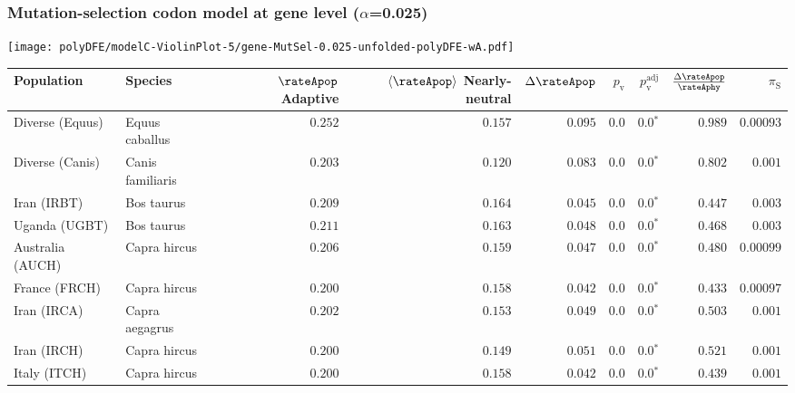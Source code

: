 \subsubsection*{Mutation-selection codon model at gene level ($\alpha$=0.025)}
\begin{center}
    \texttt{[image: polyDFE/modelC-ViolinPlot-5/gene-MutSel-0.025-unfolded-polyDFE-wA.pdf]}
    \begin{adjustbox}{width = 1\textwidth}
        \begin{tabular}{|l|l|r|r|r|r|r|r|r|}
            \toprule
            Population & Species & \specialcell{$\rateApop$ \\ Adaptive}                & \specialcell{$\left< \rateApop \right>$ \\ Nearly-neutral}                & $\Delta \rateApop $    & $p_{\mathrm{v}}$ & $p_{\mathrm{v}}^{\mathrm{adj}}$ & $\frac{\Delta\rateApop}{\rateAphy}$ & $\pi_{\textrm{S}}$ \\
            \midrule
            Diverse (Equus)                    & Equus caballus          & $ 0.252$ & $ 0.157$ & $ 0.095$ & $0.0$ & $\bm{0.0{^*}}$ & $ 0.989$ & $0.00093$  \\
            Diverse (Canis)                  & Canis familiaris          & $ 0.203$ & $ 0.120$ & $ 0.083$ & $0.0$ & $\bm{0.0{^*}}$ & $ 0.802$ & $ 0.001$ \\
            Iran (IRBT)               & Bos taurus        & $ 0.209$ & $ 0.164$ & $ 0.045$ & $0.0$ & $\bm{0.0{^*}}$ & $ 0.447$ & $ 0.003$ \\
            Uganda (UGBT)                  & Bos taurus        & $ 0.211$ & $ 0.163$ & $ 0.048$ & $0.0$ & $\bm{0.0{^*}}$ & $ 0.468$ & $ 0.003$ \\
            Australia (AUCH)                    & Capra hircus      & $ 0.206$ & $ 0.159$ & $ 0.047$ & $0.0$ & $\bm{0.0{^*}}$ & $ 0.480$ & $0.00099$ \\
            France (FRCH)                    & Capra hircus        & $ 0.200$ & $ 0.158$ & $ 0.042$ & $0.0$ & $\bm{0.0{^*}}$ & $ 0.433$ & $0.00097$ \\
            Iran (IRCA)                   & Capra aegagrus        & $ 0.202$ & $ 0.153$ & $ 0.049$ & $0.0$ & $\bm{0.0{^*}}$ & $ 0.503$ & $ 0.001$ \\
            Iran (IRCH)                 & Capra hircus        & $ 0.200$ & $ 0.149$ & $ 0.051$ & $0.0$ & $\bm{0.0{^*}}$ & $ 0.521$ & $ 0.001$ \\
            Italy (ITCH)                    & Capra hircus          & $ 0.200$ & $ 0.158$ & $ 0.042$ & $0.0$ & $\bm{0.0{^*}}$ & $ 0.439$ & $ 0.001$  \\

\end{tabular}
\end{adjustbox}
\end{center}
